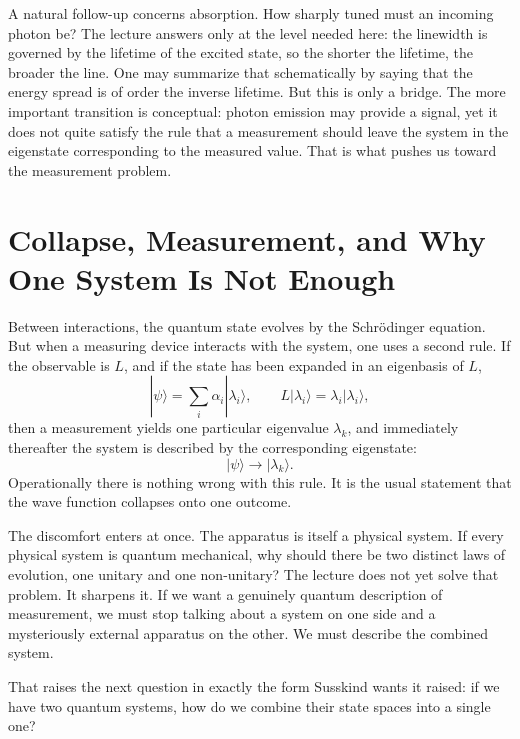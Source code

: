 A natural follow-up concerns absorption. How sharply tuned must an incoming photon be? The lecture answers only at the level needed here: the linewidth is governed by the lifetime of the excited state, so the shorter the lifetime, the broader the line. One may summarize that schematically by saying that the energy spread is of order the inverse lifetime. But this is only a bridge. The more important transition is conceptual: photon emission may provide a signal, yet it does not quite satisfy the rule that a measurement should leave the system in the eigenstate corresponding to the measured value. That is what pushes us toward the measurement problem.

\section{Collapse, Measurement, and Why One System Is Not Enough}

Between interactions, the quantum state evolves by the Schr\"odinger equation. But when a measuring device interacts with the system, one uses a second rule. If the observable is \(L\), and if the state has been expanded in an eigenbasis of \(L\),
\begin{equation}
|\psi\rangle=\sum_i \alpha_i |\lambda_i\rangle,
\qquad
L|\lambda_i\rangle=\lambda_i|\lambda_i\rangle,
\end{equation}
then a measurement yields one particular eigenvalue \(\lambda_k\), and immediately thereafter the system is described by the corresponding eigenstate:
\begin{equation}
|\psi\rangle \longrightarrow |\lambda_k\rangle.
\end{equation}
Operationally there is nothing wrong with this rule. It is the usual statement that the wave function collapses onto one outcome.

The discomfort enters at once. The apparatus is itself a physical system. If every physical system is quantum mechanical, why should there be two distinct laws of evolution, one unitary and one non-unitary? The lecture does not yet solve that problem. It sharpens it. If we want a genuinely quantum description of measurement, we must stop talking about a system on one side and a mysteriously external apparatus on the other. We must describe the combined system.

That raises the next question in exactly the form Susskind wants it raised: if we have two quantum systems, how do we combine their state spaces into a single one?

